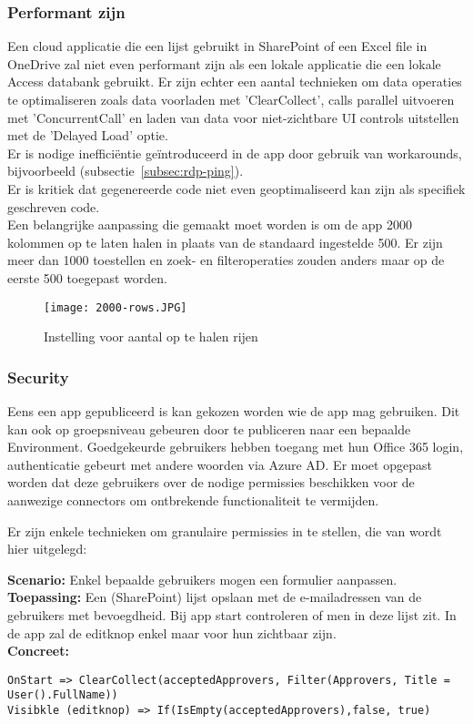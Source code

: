 \subsubsection{Performant zijn}

Een cloud applicatie die een lijst gebruikt in SharePoint of een Excel file in OneDrive zal niet even performant zijn als een lokale applicatie die een lokale Access databank gebruikt. Er zijn echter een aantal technieken om data operaties te optimaliseren zoals data voorladen met 'ClearCollect', calls parallel uitvoeren met 'ConcurrentCall' en laden van data voor niet-zichtbare UI controls uitstellen met de 'Delayed Load' optie. \autocite{Andaloussi2018}\\
Er is nodige inefficiëntie geïntroduceerd in de app door gebruik van workarounds, bijvoorbeeld (subsectie~\ref{subsec:rdp-ping}).\\
Er is kritiek dat gegenereerde code niet even geoptimaliseerd kan zijn als specifiek geschreven code. \autocite{Shiah2018}\\
Een belangrijke aanpassing die gemaakt moet worden is om de app 2000 kolommen op te laten halen in plaats van de standaard ingestelde 500. Er zijn meer dan 1000 toestellen en zoek- en filteroperaties zouden anders maar op de eerste 500 toegepast worden.

\begin{figure}[h!]
    \texttt{[image: 2000-rows.JPG]}
    \caption{Instelling voor aantal op te halen rijen}
    \label{fig:2000-rows}
\end{figure}

\subsubsection{Security}

Eens een app gepubliceerd is kan gekozen worden wie de app mag gebruiken. Dit kan ook op groepsniveau gebeuren door te publiceren naar een bepaalde Environment. Goedgekeurde gebruikers hebben toegang met hun Office 365 login, authenticatie gebeurt met andere woorden via Azure AD. Er moet opgepast worden dat deze gebruikers over de nodige permissies beschikken voor de aanwezige connectors om ontbrekende functionaliteit te vermijden.

Er zijn enkele technieken om granulaire permissies in te stellen, die van \textcite{Dunnam2019} wordt hier uitgelegd:

\textbf{Scenario:} Enkel bepaalde gebruikers mogen een formulier aanpassen.\\
\textbf{Toepassing:} Een (SharePoint) lijst opslaan met de e-mailadressen van de gebruikers met bevoegdheid. Bij app start controleren of men in deze lijst zit. In de app zal de editknop enkel maar voor hun zichtbaar zijn.\\
\textbf{Concreet:} 
\begin{lstlisting}
OnStart => ClearCollect(acceptedApprovers, Filter(Approvers, Title = User().FullName))
Visibkle (editknop) => If(IsEmpty(acceptedApprovers),false, true)
\end{lstlisting} 

